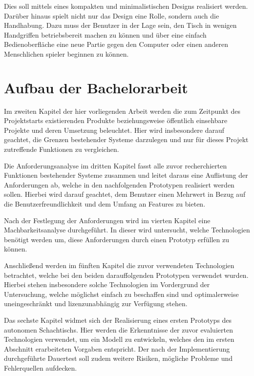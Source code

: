 Dies soll mittels eines kompakten und minimalistischen Designs
realisiert werden. Darüber hinaus spielt nicht nur das Design eine
Rolle, sondern auch die Handhabung. Dazu muss der Benutzer in der Lage
sein, den Tisch in wenigen Handgriffen betriebsbereit machen zu können
und über eine einfach Bedienoberfläche eine neue Partie gegen den
Computer oder einen anderen Menschlichen spieler beginnen zu können.

\hypertarget{aufbau-der-bachelorarbeit}{%
\section{Aufbau der Bachelorarbeit}\label{aufbau-der-bachelorarbeit}}

Im zweiten Kapitel der hier vorliegenden Arbeit werden die zum Zeitpunkt
des Projektstarts existierenden Produkte beziehungsweise öffentlich
einsehbare Projekte und deren Umsetzung beleuchtet. Hier wird
insbesondere darauf geachtet, die Grenzen bestehender Systeme darzulegen
und nur für dieses Projekt zutreffende Funktionen zu vergleichen.

Die Anforderungsanalyse im dritten Kapitel fasst alle zuvor
recherchierten Funktionen bestehender Systeme zusammen und leitet daraus
eine Auflistung der Anforderungen ab, welche in den nachfolgenden
Prototypen realisiert werden sollen. Hierbei wird darauf geachtet, dem
Benutzer einen Mehrwert in Bezug auf die Benutzerfreundlichkeit und dem
Umfang an Features zu bieten.

Nach der Festlegung der Anforderungen wird im vierten Kapitel eine
Machbarkeitsanalyse durchgeführt. In dieser wird untersucht, welche
Technologien benötigt werden um, diese Anforderungen durch einen
Prototyp erfüllen zu können.

Anschließend werden im fünften Kapitel die zuvor verwendeten
Technologien betrachtet, welche bei den beiden darauffolgenden
Prototypen verwendet wurden. Hierbei stehen insbesondere solche
Technologien im Vordergrund der Untersuchung, welche möglichst einfach
zu beschaffen sind und optimalerweise uneingeschränkt und
lizenzunabhängig zur Verfügung stehen.

Das sechste Kapitel widmet sich der Realisierung eines ersten Prototyps
des autonomen Schachtischs. Hier werden die Erkenntnisse der zuvor
evaluierten Technologien verwendet, um ein Modell zu entwickeln, welches
den im ersten Abschnitt erarbeiteten Vorgaben entspricht. Der nach der
Implementierung durchgeführte Dauertest soll zudem weitere Risiken,
mögliche Probleme und Fehlerquellen aufdecken.

